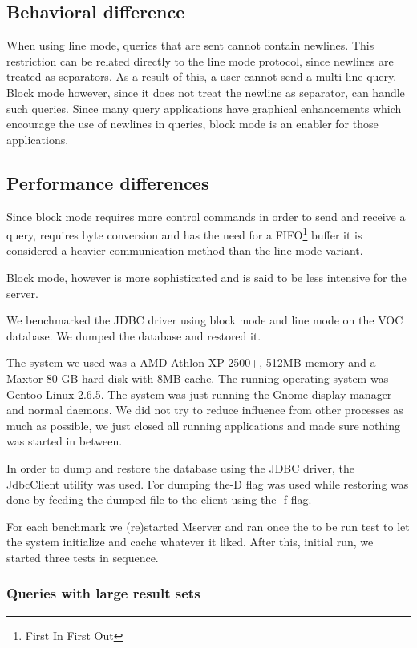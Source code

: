 \documentclass{article}
\begin{document}
\subsection{Behavioral difference}

When using line mode, queries that are sent cannot contain newlines.
This restriction can be related directly to the line mode protocol, since
newlines are treated as separators. As a result of this, a user cannot
send a multi-line query. Block mode however, since it does not treat
the newline as separator, can handle such queries. Since many
query applications have graphical enhancements which encourage
the use of newlines in queries, block mode is an enabler for those
applications.


\subsection{Performance differences}

Since block mode requires more control commands in order to send and
receive a query, requires byte conversion and has the need for a
FIFO\footnote{First In First Out} buffer it is considered a heavier
communication method than the line mode variant.

Block mode, however is more sophisticated and is said to be less
intensive for the server.

We benchmarked the JDBC driver using block mode and line mode on
the VOC database. We dumped the database and restored it.

The system we used was a AMD Athlon XP 2500+, 512MB memory
and a Maxtor 80 GB hard disk with 8MB cache. The running operating
system was Gentoo Linux 2.6.5. The system was just running the
Gnome display manager and normal daemons. We did not try to
reduce influence from other processes as much as possible, we just
closed all running applications and made sure nothing was started
in between.

In order to dump and restore the database using the JDBC driver, the
\textsf{JdbcClient} utility was used. For dumping the\textsf{-D} flag
was used while restoring was done by feeding the dumped file to the
client using the \textsf{-f} flag.

For each benchmark we (re)started Mserver and ran once the to be
run test to let the system initialize and cache whatever it liked.
After this, initial run, we started three tests in sequence.


\subsubsection{Queries with large result sets}
\end{document}
